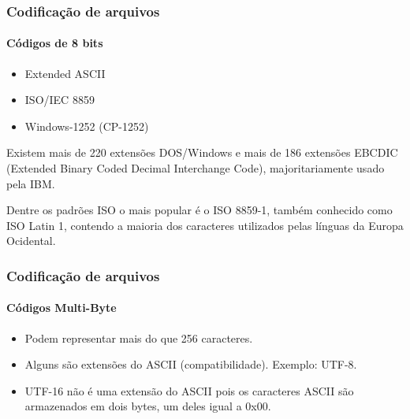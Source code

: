 \begin{frame}
\frametitle{Codificação de arquivos}
\framesubtitle{Códigos de 8 bits}
  \begin{itemize}
  \item Extended ASCII 
  \item ISO/IEC 8859
  \item Windows-1252 (CP-1252)
  \end{itemize}

  Existem mais de 220 extensões DOS/Windows e 
  mais de 186 extensões EBCDIC (Extended Binary Coded Decimal Interchange Code),
  majoritariamente usado pela IBM.

  Dentre os padrões ISO o mais popular é o ISO 8859-1, também conhecido como ISO Latin 1,
  contendo a maioria dos caracteres utilizados pelas línguas da Europa Ocidental.
\end{frame}

\begin{frame}
\frametitle{Codificação de arquivos}
\framesubtitle{Códigos Multi-Byte}
  \begin{itemize}
  \item Podem representar mais do que 256 caracteres.
  \item Alguns são extensões do ASCII (compatibilidade). Exemplo: UTF-8.
  \item UTF-16 não é uma extensão do ASCII pois os caracteres ASCII são armazenados em dois bytes, um deles igual a 0x00.
  \end{itemize}
\end{frame}

